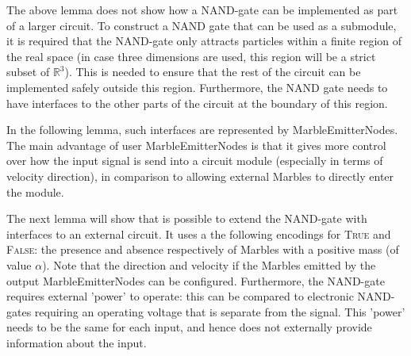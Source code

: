 The above lemma does not show how a NAND-gate can be implemented as part of a larger circuit. 
To construct a NAND gate that can be used as a submodule, 
it is required that the NAND-gate only attracts particles within a finite region of the real space 
(in case three dimensions are used, this region will be a strict subset of $\mathbb{R}^3$). 
This is needed to ensure that the rest of the circuit can be implemented safely outside this region. 
Furthermore, the NAND gate needs to have interfaces to the other parts of the circuit at the boundary of this region. 

In the following lemma, such interfaces are represented by MarbleEmitterNodes. 
The main advantage of user MarbleEmitterNodes is that it gives more control over how 
the input signal is send into a circuit module (especially in terms of velocity direction), 
in comparison to allowing external Marbles to directly enter the module.

The next lemma will show that is possible to extend the NAND-gate with interfaces to an external circuit. 
It uses a the following encodings for \textsc{True} and \textsc{False}: 
the presence and absence respectively of Marbles with a positive mass (of value $\alpha$). 
Note that the direction and velocity if the Marbles emitted by the output MarbleEmitterNodes can be configured. Furthermore, the NAND-gate requires external 'power' to operate: 
this can be compared to electronic NAND-gates requiring an operating voltage that is separate from the signal. 
This 'power' needs to be the same for each input, and hence does not externally provide information about the input.

